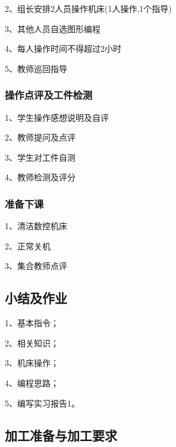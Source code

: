 2、组长安排2人员操作机床(1人操作,1个指导)

3、其他人员自选图形编程

4、每人操作时间不得超过2小时

5、教师巡回指导
\subsubsection{操作点评及工件检测}
1、学生操作感想说明及自评

2、教师提问及点评

3、学生对工件自测

4、教师检测及评分
\subsubsection{准备下课}
1、清洁数控机床

2、正常关机

3、集合教师点评

\subsection{小结及作业}

	1、基本指令；
	
	2、相关知识；
	
	3、机床操作；
	
	4、编程思路；
	
	5、编写实习报告1。


\subsection{加工准备与加工要求}
